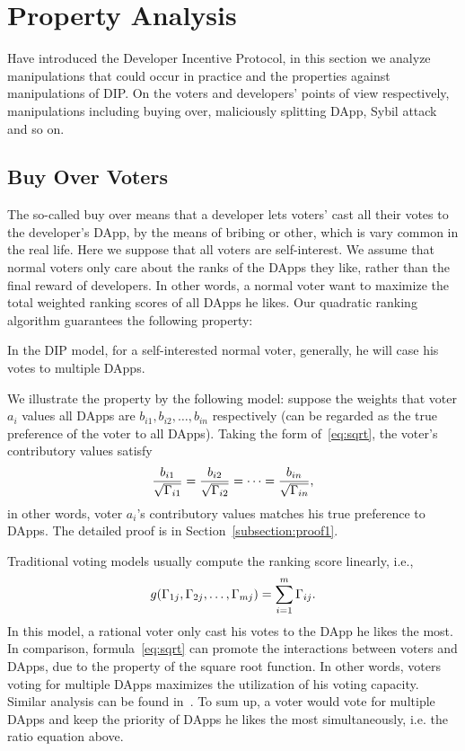 \section{Property Analysis}
\label{section:properties}
Have introduced the Developer Incentive Protocol, in this section we analyze
manipulations that could occur in practice and the properties against
manipulations of  DIP\@. On the voters and developers' points of view respectively, manipulations including buying over, maliciously splitting DApp, Sybil attack and so on.
\subsection{Buy Over Voters}
The so-called buy over means that a developer lets voters' cast all their votes to the developer's DApp, by the means of bribing or other, which is vary common in the real life. Here we suppose that all voters are self-interest. We assume that normal voters only care about the ranks of the DApps they like, rather than the final reward of developers. In other words, a normal voter want to maximize the total
weighted ranking scores of all DApps he likes. Our quadratic ranking algorithm guarantees the following property:
\begin{property}
	\label{p1}
	In the DIP model, for a self-interested normal voter, generally, he will case his votes to multiple DApps.
\end{property}
We illustrate the property by the following model: suppose the weights that
voter $a_i$ values all DApps are $b_{i1}, b_{i2}, \ldots, b_{in}$ respectively (can be regarded as the true preference of the voter to all DApps). Taking the form of~\ref{eq:sqrt}, the voter's contributory values satisfy
$$\frac{b_{i1}}{\sqrt{\Gamma_{i1}}}=\frac{b_{i2}}{\sqrt{\Gamma_{i2}}}=\cdots=\frac{b_{in}}{\sqrt{\Gamma_{in}}},$$
in other words, voter $a_i$'s contributory values matches his true preference to DApps. The detailed proof is in Section~\ref{subsection:proof1}.

Traditional voting models usually compute the ranking score linearly, i.e.,
$$g(\Gamma_{1j},\Gamma_{2j},\ldots,\Gamma_{mj}) = \sum_{i=1}^m \Gamma_{ij}.$$
In this model, a rational voter only cast his votes to the DApp he likes the
most. In comparison, formula~\ref{eq:sqrt} can promote the interactions between
voters and DApps, due to the property of the square root function. In other
words, voters voting for multiple DApps maximizes the utilization of his voting
capacity. Similar analysis can be found in~\cite{buterin2018liberal}. To sum up,
a voter would vote for multiple DApps and keep the priority of DApps he likes
the most simultaneously, i.e. the ratio equation above.

